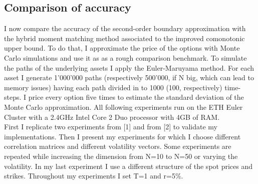 \documentclass[a4paper]{article}
\begin{document}
\subsection{Comparison of accuracy}
\label{sec:accuracy}
I now compare the accuracy of the second-order boundary approximation with the hybrid moment matching method associated to the improved comonotonic upper bound. To do that, I approximate the price of the options with Monte Carlo simulations and use it as as a rough comparison benchmark. To simulate the paths of the underlying assets I apply the Euler-Maruyama method. For each asset I generate 1'000'000 paths (respectively 500'000, if N big, which can lead to memory issues) having each path divided in to 1000 (100, respectively) time-steps. I price every option five times to estimate the standard deviation of the Monte Carlo approximation. All following experiments run on the ETH Euler Cluster with a 2.4GHz Intel Core 2 Duo processor with 4GB of RAM. \\
First I replicate two experiments from [1] and from [2] to validate my implementations. Then I present my experiments for which I choose different correlation matrices and different volatility vectors. Some experiments are repeated while increasing the dimension from N=10 to N=50 or varying the volatility. In my last experiment I use a different structure of the spot prices and strikes. Throughout my experiments I set T=1 and r=5\%.\\
\end{document}
